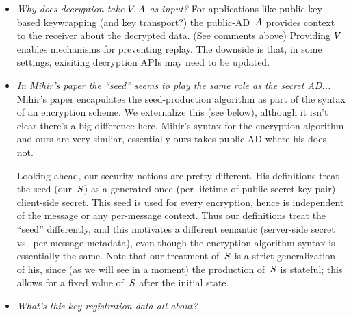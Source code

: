 \begin{itemize}
\item\emph{Why does decryption take $V,A$ as input?} For applications like public-key-based keywrapping (and key transport?) the public-AD~$A$ provides context to the receiver about the decrypted data. (See comments above)  Providing $V$ enables mechanisms for preventing replay.    The downside is that, in some settings, exisiting decryption APIs may need to be updated. 

\item\emph{In Mihir's paper the ``seed'' seems to play the same role as the secret AD...}  Mihir's paper encapulates the seed-production algorithm as part of the syntax of an encryption scheme.  We externalize this (see below), although it isn't clear there's a big difference here. Mihir's syntax for the encryption algorithm and ours are very simliar, essentially ours takes public-AD where his does not.   

Looking ahead, our security notions are pretty different.  His definitions treat the seed (our~$S$) as a generated-once (per lifetime of public-secret key pair) client-side secret.  This seed is used for every encryption, hence is independent of the message or any per-message context.  Thus our definitions treat the ``seed'' differently, and this motivates a different semantic (server-side secret vs.\ per-message metadata), even though the encryption algorithm syntax is essentially the same.  Note that our treatment of~$S$ is a strict generalization of his, since (as we will see in a moment) the production of~$S$ is stateful; this allows for a fixed value of~$S$ after the initial state. 

\item\emph{What's this key-registration data all about?}  
\end{itemize}
\fi
 



